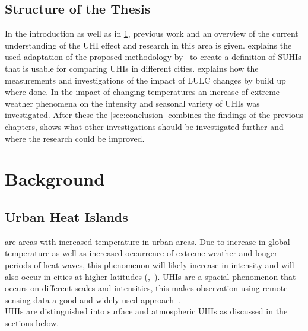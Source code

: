 \documentclass[12pt,a4paper, english,twoside]{scrartcl}
\begin{document}
  \subsection{Structure of the Thesis}\label{ssec:structure} 
    In the introduction as well as in \cref{sec:background}, previous work and an overview of the current understanding of the \gls{UHI} effect and research in this area is given. 
     explains the used adaptation of the proposed methodology by~\cite{Sobrino2020} to create a definition of \glspl{SUHI} that is usable for comparing \glspl{UHI} in different cities.  
     explains how the measurements  and investigations of the impact of \gls{LULC} changes by build up where done.
    In  the impact of changing temperatures an increase of extreme weather phenomena on the intensity and seasonal variety of \glspl{UHI} was investigated. 
    After these the \cref{sec:conclusion} combines the findings of the previous chapters, shows what other investigations should be investigated further and where the research could be improved. 
%
\newpage
\section{Background}\label{sec:background}
  \subsection{Urban Heat Islands}\label{sec:uhi}
     are areas with increased temperature in urban areas.
    Due to increase in global temperature as well as increased occurrence of extreme weather and longer periods of heat waves, this phenomenon will likely increase in intensity and will also occur in cities at higher latitudes (\cite{Sachindra2016},~\cite[p.~904]{Wilby2008}).
    \glspl{UHI} are a spacial phenomenon that occurs on different scales and intensities, this makes observation using remote sensing data a good and widely used approach~\autocite{Weng2003}.\\
    \glspl{UHI} are distinguished into surface and atmospheric \glspl{UHI} as discussed in the sections below. 
\end{document}
